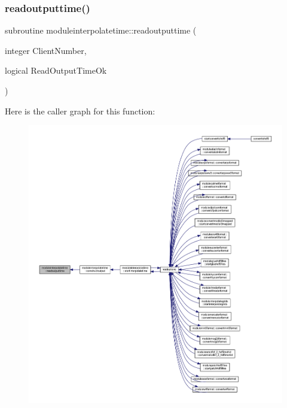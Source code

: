 \subsubsection{\texorpdfstring{readoutputtime()}{readoutputtime()}}
{\footnotesize\ttfamily subroutine moduleinterpolatetime\+::readoutputtime (\begin{DoxyParamCaption}\item[{integer}]{Client\+Number,  }\item[{logical}]{Read\+Output\+Time\+Ok }\end{DoxyParamCaption})\hspace{0.3cm}{\ttfamily [private]}}

Here is the caller graph for this function\+:\nopagebreak
\begin{figure}[H]
\begin{center}
\leavevmode
\includegraphics[width=350pt]{namespacemoduleinterpolatetime_a8c2cfcaa51773241235e7d16f6cb9e46_icgraph}
\end{center}
\end{figure}
\mbox{\label{namespacemoduleinterpolatetime_a9ee23aab51e3ce1e657af4c8074b2ae2}} 

